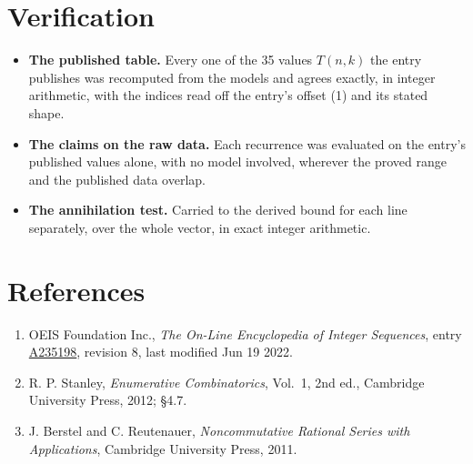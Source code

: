 \documentclass[11pt]{article}
\theoremstyle{definition}
\begin{document}
\section{Verification}

\begin{itemize}

\item {\bfseries The published table.} Every one of the 35 values $T(n,k)$ the entry publishes was recomputed from the models and agrees exactly, in integer arithmetic, with the indices read off the entry's offset (1) and its stated shape.

\item {\bfseries The claims on the raw data.} Each recurrence was evaluated on the entry's published values alone, with no model involved, wherever the proved range and the published data overlap.

\item {\bfseries The annihilation test.} Carried to the derived bound for each line separately, over the whole vector, in exact integer arithmetic.

\end{itemize}

\section{References}

\begin{enumerate}

\item OEIS Foundation Inc., \emph{The On-Line Encyclopedia of Integer Sequences}, entry \href{https://oeis.org/A235198}{A235198}, revision 8, last modified Jun 19 2022.

\item R. P. Stanley, \emph{Enumerative Combinatorics}, Vol.~1, 2nd ed., Cambridge University Press, 2012; \S4.7.

\item J. Berstel and C. Reutenauer, \emph{Noncommutative Rational Series with Applications}, Cambridge University Press, 2011.

\end{enumerate}
\end{document}
